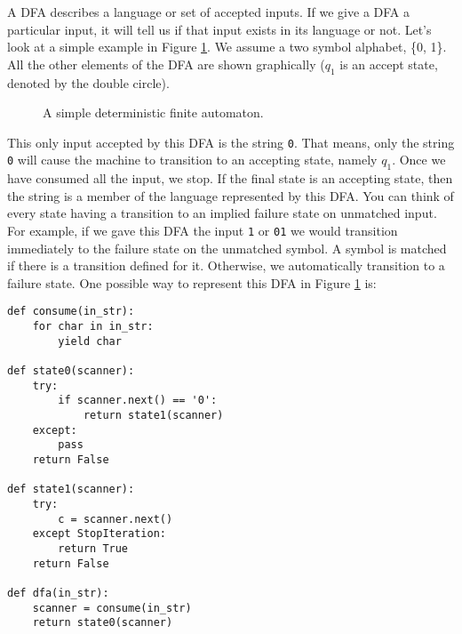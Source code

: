 A DFA describes a language or set of accepted inputs.  
If we give a DFA a particular input, it will tell us if that input exists in its language or not.
Let's look at a simple example in Figure \ref{fig:simple_dfa}.  We assume a two symbol alphabet, \{0, 1\}.  All the other elements of the DFA are shown graphically ($q_1$ is an accept state, denoted by the double circle).
\begin{figure}
\caption{A simple deterministic finite automaton.}
\label{fig:simple_dfa}
\end{figure}
This only input accepted by this DFA is the string \texttt{0}.
That means, only the string \texttt{0} will cause the machine to transition to an accepting state, namely $q_1$.
Once we have consumed all the input, we stop.
If the final state is an accepting state, then the string is a member of the language represented by this DFA.
You can think of every state having a transition to an implied failure state on unmatched input.
For example, if we gave this DFA the input \texttt{1} or \texttt{01} we would transition immediately to the failure state on the unmatched symbol.
A symbol is matched if there is a transition defined for it.
Otherwise, we automatically transition to a failure state.
One possible way to represent this DFA in Figure \ref{fig:simple_dfa} is:
\begin{lstlisting}
def consume(in_str):
    for char in in_str:
        yield char
    
def state0(scanner):
    try:
        if scanner.next() == '0':
            return state1(scanner)
    except:
        pass
    return False
    
def state1(scanner):
    try:
        c = scanner.next()
    except StopIteration:
        return True
    return False
    
def dfa(in_str):
    scanner = consume(in_str)
    return state0(scanner)
\end{lstlisting}


